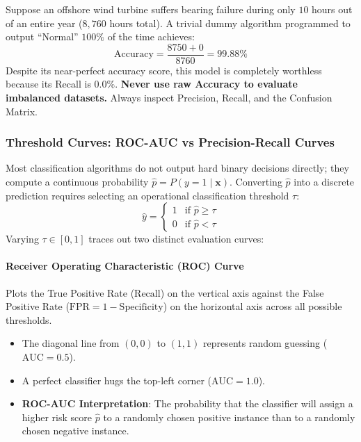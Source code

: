 \begin{warning}
Suppose an offshore wind turbine suffers bearing failure during only $10$ hours out of an entire year ($8{,}760$ hours total). A trivial dummy algorithm programmed to output ``Normal'' $100\%$ of the time achieves:
\begin{equation*}
\text{Accuracy} = \frac{8750 + 0}{8760} = \mathbf{99.88\%}
\end{equation*}
Despite its near-perfect accuracy score, this model is completely worthless because its Recall is $0.0\%$. \textbf{Never use raw Accuracy to evaluate imbalanced datasets.} Always inspect Precision, Recall, and the Confusion Matrix.
\end{warning}

\subsubsection{Threshold Curves: ROC-AUC vs Precision-Recall Curves}

Most classification algorithms do not output hard binary decisions directly; they compute a continuous probability $\hat{p} = P(y = 1 \mid \mathbf{x})$. Converting $\hat{p}$ into a discrete prediction requires selecting an operational classification threshold $\tau$:
\begin{equation}
\hat{y} = 
\begin{cases}
1 & \text{if } \hat{p} \ge \tau \\
0 & \text{if } \hat{p} < \tau
\end{cases}\label{eq:threshold_rule}
\end{equation}
Varying $\tau \in [0, 1]$ traces out two distinct evaluation curves:

\paragraph{Receiver Operating Characteristic (ROC) Curve}
Plots the True Positive Rate ($\text{Recall}$) on the vertical axis against the False Positive Rate ($\text{FPR} = 1 - \text{Specificity}$) on the horizontal axis across all possible thresholds.
\begin{itemize}
    \item The diagonal line from $(0,0)$ to $(1,1)$ represents random guessing ($\text{AUC} = 0.5$).
    \item A perfect classifier hugs the top-left corner ($\text{AUC} = 1.0$).
    \item \textbf{ROC-AUC Interpretation}: The probability that the classifier will assign a higher risk score $\hat{p}$ to a randomly chosen positive instance than to a randomly chosen negative instance.
\end{itemize}

